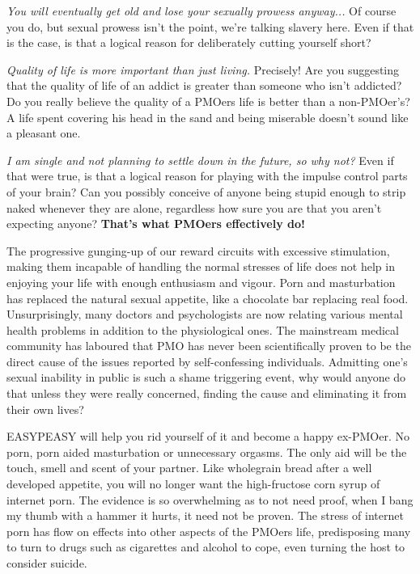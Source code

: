   \textit{You will eventually get old and lose your sexually prowess anyway...}
  Of course you do, but sexual prowess isn't the point, we're talking slavery here. Even if that is the case, is that a logical reason for deliberately cutting yourself short?

  \textit{Quality of life is more important than just living.}
  Precisely! Are you suggesting that the quality of life of an addict is greater than someone who isn't addicted? Do you really believe the quality of a PMOers life is better than a non-PMOer's? A life spent covering his head in the sand and being miserable doesn't sound like a pleasant one.

  \textit{I am single and not planning to settle down in the future, so why not?}
  Even if that were true, is that a logical reason for playing with the impulse control parts of your brain? Can you possibly conceive of anyone being stupid enough to strip naked whenever they are alone, regardless how sure you are that you aren't expecting anyone? \textbf{That's what PMOers effectively do!}

The progressive gunging-up of our reward circuits with excessive stimulation, making them incapable of handling the normal stresses of life does not help in enjoying your life with enough enthusiasm and vigour. Porn and masturbation has replaced the natural sexual appetite, like a chocolate bar replacing real food. Unsurprisingly, many doctors and psychologists are now relating various mental health problems in addition to the physiological ones. The mainstream medical community has laboured that PMO has never been scientifically proven to be the direct cause of the issues reported by self-confessing individuals. Admitting one's sexual inability in public is such a shame triggering event, why would anyone do that unless they were really concerned, finding the cause and eliminating it from their own lives?

EASYPEASY will help you rid yourself of it and become a happy ex-PMOer. No porn, porn aided masturbation or unnecessary orgasms. The only aid will be the touch, smell and scent of your partner. Like wholegrain bread after a well developed appetite, you will no longer want the high-fructose corn syrup of internet porn. The evidence is so overwhelming as to not need proof, when I bang my thumb with a hammer it hurts, it need not be proven. The stress of internet porn has flow on effects into other aspects of the PMOers life, predisposing many to turn to drugs such as cigarettes and alcohol to cope, even turning the host to consider suicide.

